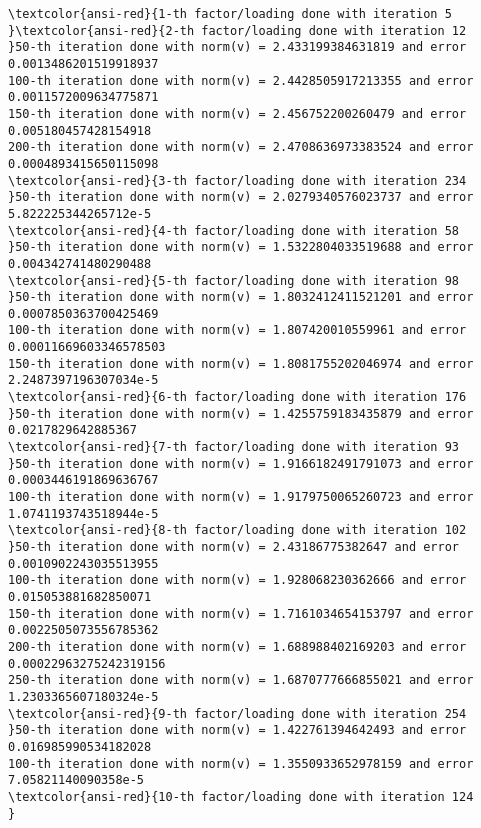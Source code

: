 \documentclass[11pt]{article}
\begin{document}
    \begin{Verbatim}[commandchars=\\\{\}]
\textcolor{ansi-red}{1-th factor/loading done with iteration 5
}\textcolor{ansi-red}{2-th factor/loading done with iteration 12
}50-th iteration done with norm(v) = 2.433199384631819 and error 0.0013486201519918937
100-th iteration done with norm(v) = 2.4428505917213355 and error 0.0011572009634775871
150-th iteration done with norm(v) = 2.456752200260479 and error 0.005180457428154918
200-th iteration done with norm(v) = 2.4708636973383524 and error 0.0004893415650115098
\textcolor{ansi-red}{3-th factor/loading done with iteration 234
}50-th iteration done with norm(v) = 2.0279340576023737 and error 5.822225344265712e-5
\textcolor{ansi-red}{4-th factor/loading done with iteration 58
}50-th iteration done with norm(v) = 1.5322804033519688 and error 0.004342741480290488
\textcolor{ansi-red}{5-th factor/loading done with iteration 98
}50-th iteration done with norm(v) = 1.8032412411521201 and error 0.0007850363700425469
100-th iteration done with norm(v) = 1.807420010559961 and error 0.00011669603346578503
150-th iteration done with norm(v) = 1.8081755202046974 and error 2.2487397196307034e-5
\textcolor{ansi-red}{6-th factor/loading done with iteration 176
}50-th iteration done with norm(v) = 1.4255759183435879 and error 0.0217829642885367
\textcolor{ansi-red}{7-th factor/loading done with iteration 93
}50-th iteration done with norm(v) = 1.9166182491791073 and error 0.0003446191869636767
100-th iteration done with norm(v) = 1.9179750065260723 and error 1.0741193743518944e-5
\textcolor{ansi-red}{8-th factor/loading done with iteration 102
}50-th iteration done with norm(v) = 2.43186775382647 and error 0.0010902243035513955
100-th iteration done with norm(v) = 1.928068230362666 and error 0.015053881682850071
150-th iteration done with norm(v) = 1.7161034654153797 and error 0.0022505073556785362
200-th iteration done with norm(v) = 1.688988402169203 and error 0.00022963275242319156
250-th iteration done with norm(v) = 1.6870777666855021 and error 1.2303365607180324e-5
\textcolor{ansi-red}{9-th factor/loading done with iteration 254
}50-th iteration done with norm(v) = 1.422761394642493 and error 0.016985990534182028
100-th iteration done with norm(v) = 1.3550933652978159 and error 7.05821140090358e-5
\textcolor{ansi-red}{10-th factor/loading done with iteration 124
}
    \end{Verbatim}
\end{document}
